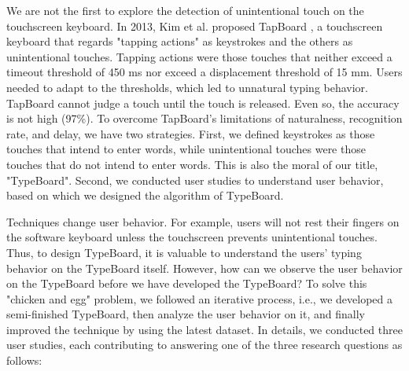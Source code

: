 
We are not the first to explore the detection of unintentional touch on the touchscreen keyboard. In 2013, Kim et al. proposed TapBoard \cite{2013-TapBoard}, a touchscreen keyboard that regards "tapping actions" as keystrokes and the others as unintentional touches. Tapping actions were those touches that neither exceed a timeout threshold of 450 ms nor exceed a displacement threshold of 15 mm. Users needed to adapt to the thresholds, which led to unnatural typing behavior. TapBoard cannot judge a touch until the touch is released. Even so, the accuracy is not high (97\%). To overcome TapBoard's limitations of naturalness, recognition rate, and delay, we have two strategies. First, we defined keystrokes as those touches that intend to enter words, while unintentional touches were those touches that do not intend to enter words. This is also the moral of our title, "TypeBoard". Second, we conducted user studies to understand user behavior, based on which we designed the algorithm of TypeBoard.

Techniques change user behavior. For example, users will not rest their fingers on the software keyboard unless the touchscreen prevents unintentional touches. Thus, to design TypeBoard, it is valuable to understand the users' typing behavior on the TypeBoard itself. However, how can we observe the user behavior on the TypeBoard before we have developed the TypeBoard? To solve this "chicken and egg" problem, we followed an iterative process, i.e., we developed a semi-finished TypeBoard, then analyze the user behavior on it, and finally improved the technique by using the latest dataset. In details, we conducted three user studies, each contributing to answering one of the three research questions as follows:


